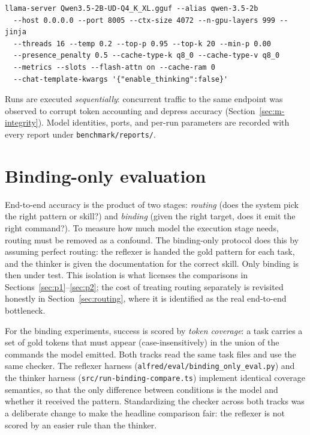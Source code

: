 \begin{lstlisting}[caption={Reflexer serving configuration (\texttt{qwen-3.5-2b});
\texttt{ministral-3-3b} uses the same parameters. Q4 quantization, temperature
$0.2$, reasoning disabled.},label={lst:serve},basicstyle=\ttfamily\scriptsize]
llama-server Qwen3.5-2B-UD-Q4_K_XL.gguf --alias qwen-3.5-2b
  --host 0.0.0.0 --port 8005 --ctx-size 4072 --n-gpu-layers 999 --jinja
  --threads 16 --temp 0.2 --top-p 0.95 --top-k 20 --min-p 0.00
  --presence_penalty 0.5 --cache-type-k q8_0 --cache-type-v q8_0
  --metrics --slots --flash-attn on --cache-ram 0
  --chat-template-kwargs '{"enable_thinking":false}'
\end{lstlisting}

Runs are executed \emph{sequentially}: concurrent traffic to the same endpoint was
observed to corrupt token accounting and depress accuracy
(Section~\ref{sec:m-integrity}). Model identities, ports, and per-run parameters
are recorded with every report under \texttt{benchmark/reports/}.

\section{Binding-only evaluation}
\label{sec:m-binding}

End-to-end accuracy is the product of two stages: \emph{routing} (does the system
pick the right pattern or skill?) and \emph{binding} (given the right target,
does it emit the right command?). To measure how much model the execution stage
needs, routing must be removed as a confound. The binding-only protocol does
this by assuming perfect routing: the reflexer is handed the gold pattern for
each task, and the thinker is given the documentation for the correct skill.
Only binding is then under test. This isolation is what licenses the comparisons
in Sections~\ref{sec:p1}--\ref{sec:p2}; the cost of treating routing separately
is revisited honestly in Section~\ref{sec:routing}, where it is identified as the
real end-to-end bottleneck.

For the binding experiments, success is scored by \emph{token coverage}: a task
carries a set of gold tokens that must appear (case-insensitively) in the union
of the commands the model emitted. Both tracks read the same task files and use
the same checker. The reflexer harness
(\texttt{alfred/eval/binding\_only\_eval.py}) and the thinker harness
(\texttt{src/run-binding-compare.ts}) implement identical coverage semantics, so
that the only difference between conditions is the model and whether it received
the pattern. Standardizing the checker across both tracks was a deliberate change
to make the headline comparison fair: the reflexer is not scored by an easier
rule than the thinker.

